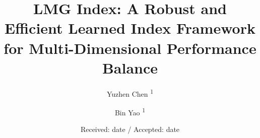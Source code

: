 \makeatletter
\def\makeheadbox{\relax}
\makeatother
%


\title{LMG Index: A Robust and Efficient Learned Index Framework for Multi-Dimensional Performance Balance}


\author{Yuzhen Chen \textsuperscript{1}\and
        Bin Yao \textsuperscript{1}
}



\date{Received: date / Accepted: date}


\maketitle

